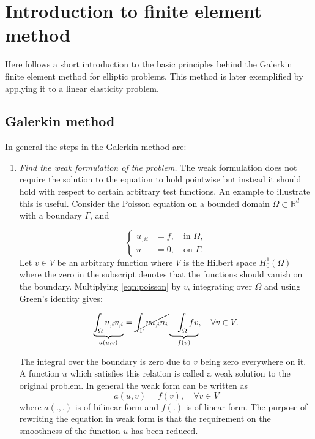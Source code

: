 \documentclass[fem.tex]{subfiles}
\begin{document}
\chapter{Introduction to finite element method}

Here follows a short introduction to the basic principles behind the Galerkin finite element method for elliptic problems.  This method is later exemplified by applying it to a linear elasticity problem.

\section{Galerkin method}
\label{sec:galerkin}

In general the steps in the Galerkin method are:
\begin{enumerate}
\item \emph{Find the weak formulation of the problem.} The weak formulation does not require the solution to the equation to hold pointwise but instead it should hold with respect to certain arbitrary test functions. An example to illustrate this is useful. Consider the Poisson equation on a bounded domain $\Omega \subset \mathbb{R}^d$ with a boundary $\Gamma$, and


\begin{equation}
\left\{ \begin{array}{ll}
u_{,ii} & = f, \quad \text{in } \Omega, \\
u & = 0, \quad  \text{on } \Gamma. \end{array} \right.
\label{eqn:poisson}
\end{equation}
Let $v \in V$ be an arbitrary function where $V$ is the Hilbert space $H_0^1(\Omega)$ where the zero in the subscript denotes that the functions should vanish on the boundary. Multiplying \ref{eqn:poisson} by $v$, integrating over $\Omega$ and using Green's identity gives:

\begin{align}
\underbrace{\int_\Omega u_{,i} v_{,i}}_{a(u,v)} = \cancel{\int_\Gamma v u_{,i} n_i } \underbrace{- \int_\Omega fv}_{f(v)}, \quad \forall v \in V.
\end{align}

The integral over the boundary is zero due to $v$ being zero everywhere on it. A function $u$ which satisfies this relation is called a weak solution to the original problem. In general the weak form can be written as
\begin{equation}
\label{eqn:weak_gen}
    a(u,v) = f(v), \quad \forall v \in V
\end{equation}
where $a(.,.)$ is of bilinear form and $f(.)$ is of linear form. The purpose of rewriting the equation in weak form is that the requirement on the smoothness of the function $u$ has been reduced. 


\end{enumerate}
\end{document}
